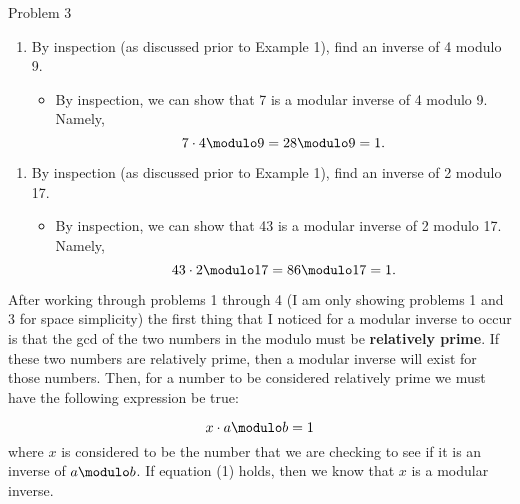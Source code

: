 \begin{problem}{Problem 3}
    \begin{Highlight}[Solution - \# 3]
        \begin{enumerate}[start = 3]
            \item By inspection (as discussed prior to Example 1), find an inverse of 4 modulo 9.
            \begin{itemize}
                \item By inspection, we can show that 7 is a modular inverse of 4 modulo 9. Namely,
                \begin{equation*}
                    7 \cdot 4 \modulo 9 = 28 \modulo 9 = 1.
                \end{equation*}
            \end{itemize}
        \end{enumerate}
    \end{Highlight}

    \begin{Highlight}[Solution - \#4]
        \begin{enumerate}[start = 4]
            \item By inspection (as discussed prior to Example 1), find an inverse of 2 modulo 17.
            \begin{itemize}
                \item By inspection, we can show that 43 is a modular inverse of 2 modulo 17. Namely,
                \begin{equation*}
                    43 \cdot 2 \modulo 17 = 86 \modulo 17 = 1.
                \end{equation*}
            \end{itemize}
        \end{enumerate}
    \end{Highlight}

    \begin{Highlight}[Synopsis]
        After working through problems 1 through 4 (I am only showing problems 1 and 3 for space simplicity) the first thing that I noticed for a modular inverse to occur is that the gcd of the two
        numbers in the modulo must be \textbf{relatively prime}. If these two numbers are relatively prime, then a modular inverse will exist for those numbers. Then, for a number to be considered
        relatively prime we must have the following expression be true:

        \setcounter{equation}{0}
        \begin{equation}
            x \cdot a \modulo b = 1
        \end{equation}
        where $x$ is considered to be the number that we are checking to see if it is an inverse of $a \modulo b$. If equation (1) holds, then we know that $x$ is a modular inverse.


\end{Highlight}
\end{problem}
